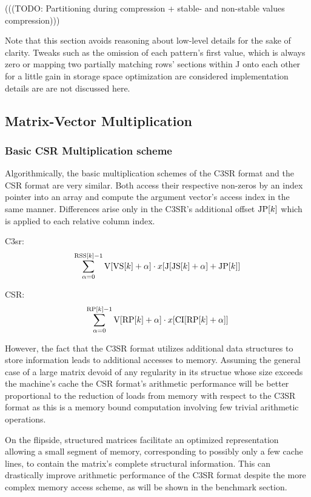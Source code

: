 \documentclass{article}
\begin{document}
    (((TODO: Partitioning during compression + stable- and non-stable values compression)))

    Note that this section avoids reasoning about low-level details for the sake of clarity. Tweaks such as the omission
    of each pattern's first value, which is always zero or mapping two partially matching rows' sections within J onto
    each other for a little gain in storage space optimization are considered implementation details are are not discussed
    here.

  \subsection{Matrix-Vector Multiplication}

    \subsubsection{Basic CSR Multiplication scheme}

      Algorithmically, the basic multiplication schemes of the C3SR format and the CSR format are very similar. Both access their respective non-zeros by an index pointer into an array and compute the argument vector's access index in the same manner. Differences arise only in the C3SR's additional offset $\JP[k]$ which is applied to each relative column index.

      C3sr:
      $$\sum \limits_{\alpha = 0}^{\RSS[k] - 1} \V[\VS[k] + \alpha] \cdot x[\J[\JS[k] + \alpha] + \JP[k]]$$

      CSR:
      $$\sum \limits_{\alpha = 0}^{\RP[k] - 1} \V[\RP[k] + \alpha] \cdot x[\CI[\RP[k] + \alpha]]$$

      However, the fact that the C3SR format utilizes additional data structures to store information leads to additional accesses to memory. Assuming the general case of a large matrix devoid of any regularity in its structue whose size exceeds the machine's cache the CSR format's arithmetic performance will be better proportional to the reduction of loads from memory with respect to the C3SR format as this is a memory bound computation involving few trivial arithmetic operations.

      On the flipside, structured matrices facilitate an optimized representation allowing a small segment of memory, corresponding to possibly only a few cache lines, to contain the matrix's complete structural information. This can drastically improve arithmetic performance of the C3SR format despite the more complex memory access scheme, as will be shown in the benchmark section.
\end{document}
